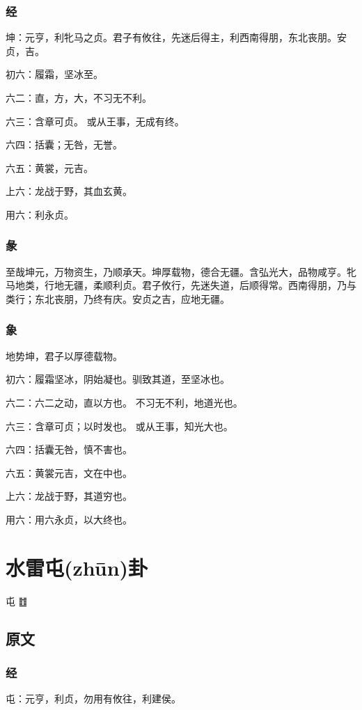 \documentclass[12pt,oneside]{book}
\begin{document}
\subsection{经}
坤：元亨，利牝马之贞。君子有攸往，先迷后得主，利西南得朋，东北丧朋。安贞，吉。

初六：履霜，坚冰至。

六二：直，方，大，不习无不利。

六三：含章可贞。 或从王事，无成有终。

六四：括囊；无咎，无誉。

六五：黄裳，元吉。

上六：龙战于野，其血玄黄。

用六：利永贞。

\subsection{彖}
至哉坤元，万物资生，乃顺承天。坤厚载物，德合无疆。含弘光大，品物咸亨。牝马地类，行地无疆，柔顺利贞。君子攸行，先迷失道，后顺得常。西南得朋，乃与类行；东北丧朋，乃终有庆。安贞之吉，应地无疆。

\subsection{象}
地势坤，君子以厚德载物。

初六：履霜坚冰，阴始凝也。驯致其道，至坚冰也。

六二：六二之动，直以方也。 不习无不利，地道光也。

六三：含章可贞；以时发也。 或从王事，知光大也。

六四：括囊无咎，慎不害也。

六五：黄裳元吉，文在中也。

上六：龙战于野，其道穷也。

用六：用六永贞，以大终也。



\chapter{水雷屯(zhūn)卦}
屯 {\Large ䷂}

\section{原文}
\subsection{经}
屯：元亨，利贞，勿用有攸往，利建侯。
\end{document}
